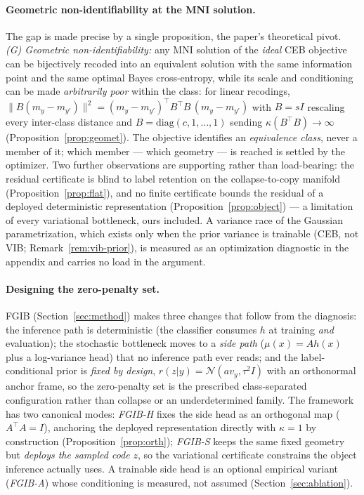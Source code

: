 \documentclass{article} %
\newcommand{\Ncal}{\mathcal{N}}
\begin{document}
\paragraph{Geometric non-identifiability at the MNI solution.}
The gap is made precise by a single proposition, the paper's theoretical pivot.
\emph{(G) Geometric non-identifiability:} any MNI solution of the \emph{ideal} CEB
objective can be bijectively recoded into an equivalent solution with the same
information point and the same optimal Bayes cross-entropy, while its scale and
conditioning can be made \emph{arbitrarily poor} within the class: for linear
recodings, $\|B(m_y - m_{y'})\|^2 = (m_y - m_{y'})^{\top}B^{\top}B\,(m_y - m_{y'})$
with $B = sI$ rescaling every inter-class distance and
$B = \mathrm{diag}(c,1,\dots,1)$ sending $\kappa(B^{\top}B) \to \infty$
(Proposition~\ref{prop:geomet}). The objective identifies an \emph{equivalence class},
never a member of it; which member --- which geometry --- is reached is settled by the
optimizer. Two further observations are supporting rather than load-bearing: the
residual certificate is blind to label retention on the collapse-to-copy manifold
(Proposition~\ref{prop:flat}), and no finite certificate bounds the residual of a
deployed deterministic representation (Proposition~\ref{prop:object}) --- a limitation
of every variational bottleneck, ours included. A variance race of the Gaussian
parametrization, which exists only when the prior variance is trainable (CEB, not VIB;
Remark~\ref{rem:vib-prior}), is measured as an optimization diagnostic in the appendix
and carries no load in the argument.

\paragraph{Designing the zero-penalty set.}
FGIB (Section~\ref{sec:method}) makes three changes that follow from the diagnosis:
the inference path is deterministic (the classifier consumes $h$ at training
\emph{and} evaluation); the stochastic bottleneck moves to a \emph{side path}
($\mu(x) = Ah(x)$ plus a log-variance head) that no inference path ever reads; and the
label-conditional prior is \emph{fixed by design}, $r(z|y) = \Ncal(a v_y, \tau^2 I)$
with an orthonormal anchor frame, so the zero-penalty set is the prescribed
class-separated configuration rather than collapse or an underdetermined family. The
framework has two canonical modes: \emph{FGIB-H} fixes the side head as an orthogonal
map ($A^{\top}A = I$), anchoring the deployed representation directly with $\kappa = 1$
by construction (Proposition~\ref{prop:orth}); \emph{FGIB-S} keeps the same fixed
geometry but \emph{deploys the sampled code} $z$, so the variational certificate
constrains the object inference actually uses. A trainable side head is an optional
empirical variant (\emph{FGIB-A}) whose conditioning is measured, not assumed
(Section~\ref{sec:ablation}).
\end{document}
